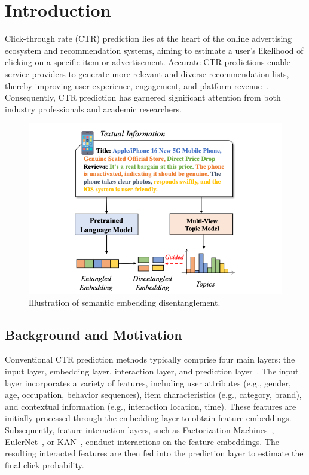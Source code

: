 \chapter{Introduction}

\label{chap:introduction}

Click-through rate (CTR) prediction lies at the heart of the online advertising ecosystem and recommendation systems, aiming to estimate a user's likelihood of clicking on a specific item or advertisement. Accurate CTR predictions enable service providers to generate more relevant and diverse recommendation lists, thereby improving user experience, engagement, and platform revenue~\cite{chen2016deep, zhou2018deep}. Consequently, CTR prediction has garnered significant attention from both industry professionals and academic researchers.

\begin{figure}[t]
    \centering
    \includegraphics[width=0.9\linewidth]{Figures/Chapter1/figure1.png}
    \caption{Illustration of semantic embedding disentanglement.}
    \label{fig:disentangle}
\end{figure}

\section{Background and Motivation}

Conventional CTR prediction methods typically comprise four main layers: the input layer, embedding layer, interaction layer, and prediction layer~\cite{guo2017deepfm, wang2021dcn}. The input layer incorporates a variety of features, including user attributes (e.g., gender, age, occupation, behavior sequences), item characteristics (e.g., category, brand), and contextual information (e.g., interaction location, time). These features are initially processed through the embedding layer to obtain feature embeddings. Subsequently, feature interaction layers, such as Factorization Machines~\cite{rendle2010factorization}, EulerNet~\cite{tian2023eulernet}, or KAN~\cite{shi2024beyond}, conduct interactions on the feature embeddings. The resulting interacted features are then fed into the prediction layer to estimate the final click probability.

